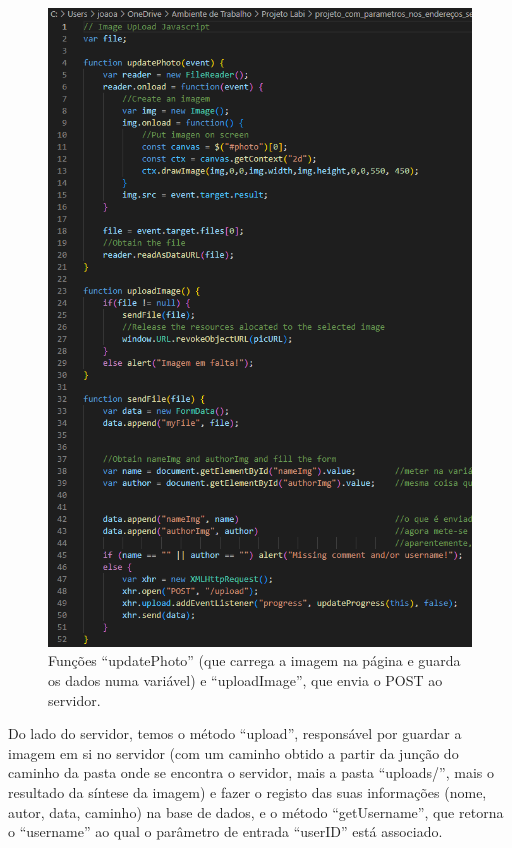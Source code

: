 \documentclass{report}
\begin{document}
\begin{figure}

        \includegraphics[scale=0.63]{Images_code/9 - js upload.png}
        \caption{\label{Estrutura}Funções “updatePhoto” (que carrega a imagem na página e guarda os dados numa variável) e “uploadImage”, que envia o POST ao servidor.}
\end{figure}




\newpage

Do lado do servidor, temos o método “upload”, responsável por guardar a imagem em si no servidor (com um caminho obtido a partir da junção do caminho da pasta onde se encontra o servidor, mais a pasta “uploads/”, mais o resultado da síntese da imagem) e fazer o registo das suas informações (nome, autor, data, caminho) na base de dados, e o método “getUsername”, que retorna o “username” ao qual o parâmetro de entrada “userID” está associado.
\end{document}
